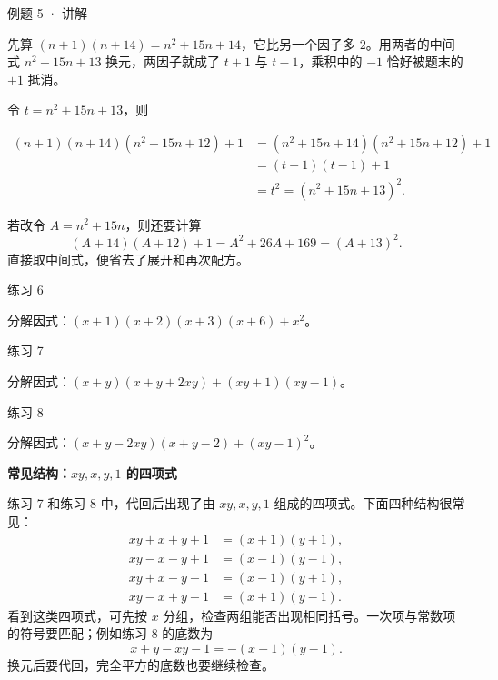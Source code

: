 
\begin{solution}{例题 5 · 讲解}

\think 先算 $(n+1)(n+14)=n^2+15n+14$，它比另一个因子多 $2$。用两者的中间式 $n^2+15n+13$ 换元，两因子就成了 $t+1$ 与 $t-1$，乘积中的 $-1$ 恰好被题末的 $+1$ 抵消。

\solve 令 $t=n^2+15n+13$，则

\begin{align*}
(n+1)(n+14)(n^2+15n+12)+1
&=(n^2+15n+14)(n^2+15n+12)+1\\
&=(t+1)(t-1)+1\\
&=t^2=(n^2+15n+13)^2.
\end{align*}

若改令 $A=n^2+15n$，则还要计算
\[(A+14)(A+12)+1=A^2+26A+169=(A+13)^2.\]
直接取中间式，便省去了展开和再次配方。


\end{solution}


\begin{problem}{练习 6}

分解因式：$(x+1)(x+2)(x+3)(x+6)+x^2$。

\end{problem}

\begin{problem}{练习 7}

分解因式：$(x+y)(x+y+2xy)+(xy+1)(xy-1)$。

\end{problem}

\begin{problem}{练习 8}

分解因式：$(x+y-2xy)(x+y-2)+(xy-1)^2$。

\end{problem}

\ifstudentnotes\else
\begin{tcolorbox}[knotweld,breakable=false]
\textbf{常见结构：$xy,x,y,1$ 的四项式}\par\smallskip
练习 7 和练习 8 中，代回后出现了由 $xy,x,y,1$ 组成的四项式。下面四种结构很常见：
\begin{align*}
xy+x+y+1&=(x+1)(y+1),\\
xy-x-y+1&=(x-1)(y-1),\\
xy+x-y-1&=(x-1)(y+1),\\
xy-x+y-1&=(x+1)(y-1).
\end{align*}
看到这类四项式，可先按 $x$ 分组，检查两组能否出现相同括号。一次项与常数项的符号要匹配；例如练习 8 的底数为
\[x+y-xy-1=-(x-1)(y-1).\]
换元后要代回，完全平方的底数也要继续检查。
\end{tcolorbox}
\fi

